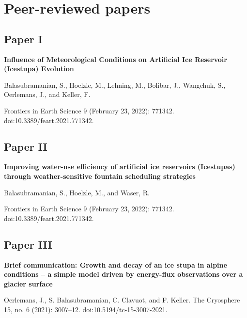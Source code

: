 \pagestyle{empty}				%
\chapter{Peer-reviewed papers}

\section{Paper I}
\vfil\null
\huge{\textbf{Influence of Meteorological Conditions on Artificial Ice Reservoir (Icestupa) Evolution}}

\bigskip
\large{Balasubramanian, S., Hoelzle, M., Lehning, M., Bolibar, J., Wangchuk, S.,
  Oerlemans, J., and Keller, F. \par  Frontiers in Earth Science 9 (February 23, 2022): 771342.
doi:10.3389/feart.2021.771342.}



\section{Paper II}
\vfil\null
\huge{\textbf{Improving water-use efficiency of artificial ice reservoirs (Icestupas) through weather-sensitive fountain scheduling
strategies}}

\bigskip
\large{Balasubramanian, S., Hoelzle, M., and Waser, R. \par  Frontiers in Earth Science 9 (February 23, 2022): 771342. doi:10.3389/feart.2021.771342.}



\section{Paper III}
\vfil\null
\huge{\textbf{Brief communication: Growth and decay of an ice stupa in alpine conditions – a simple model driven by energy-flux observations over a glacier surface}}

\bigskip
\large{
Oerlemans, J., S. Balasubramanian, C. Clavuot, and F. Keller. The Cryosphere 15, no. 6 (2021): 3007–12. doi:10.5194/tc-15-3007-2021.
  }





